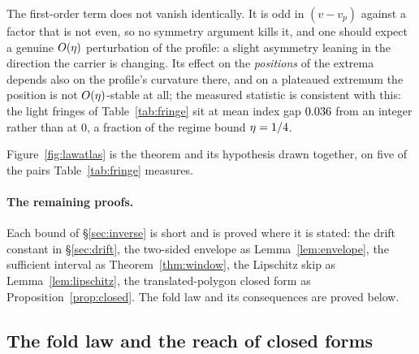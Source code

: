 \begin{remark}
The first-order term does not vanish identically. It is odd in
$(v-v_p)$ against a factor that is not even, so no symmetry argument kills it,
and one should expect a genuine $O(\eta)$ perturbation of the profile: a
slight asymmetry leaning in the direction the carrier is changing. Its effect
on the \emph{positions} of the extrema depends also on the profile's curvature
there, and on a plateaued extremum the position is not $O(\eta)$-stable at all;
the measured statistic is consistent with this: the light fringes of
Table~\ref{tab:fringe} sit at mean index gap $0.036$ from an integer
rather than at $0$, a fraction of the regime bound $\eta=1/4$.
\end{remark}

Figure~\ref{fig:lawatlas} is the theorem and its hypothesis drawn together, on five
of the pairs Table~\ref{tab:fringe} measures.

\paragraph{The remaining proofs.} Each bound of \S\ref{sec:inverse} is short and is
proved where it is stated: the drift constant in \S\ref{sec:drift}, the two-sided
envelope as Lemma~\ref{lem:envelope}, the sufficient interval as
Theorem~\ref{thm:window}, the Lipschitz skip as Lemma~\ref{lem:lipschitz}, the
translated-polygon closed form as Proposition~\ref{prop:closed}. The fold law
and its consequences are proved below.

\subsection{The fold law and the reach of closed forms}
\label{app:foldlaw}


